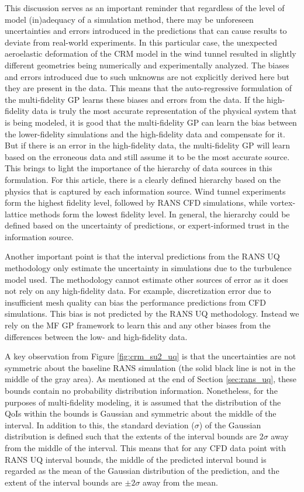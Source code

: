 This discussion serves as an important reminder that regardless of the level of model (in)adequacy of a simulation method, there may be unforeseen uncertainties and errors introduced in the predictions that can cause results to deviate from real-world experiments. In this particular case, the unexpected aeroelastic deformation of the CRM model in the wind tunnel resulted in slightly different geometries being numerically and experimentally analyzed. The biases and errors introduced due to such unknowns are not explicitly derived here but they are present in the data. This means that the auto-regressive formulation of the multi-fidelity GP learns these biases and errors from the data. If the high-fidelity data is truly the most accurate representation of the physical system that is being modeled, it is good that the multi-fidelity GP can learn the bias between the lower-fidelity simulations and the high-fidelity data and compensate for it. But if there is an error in the high-fidelity data, the multi-fidelity GP will learn based on the erroneous data and still assume it to be the most accurate source. This brings to light the importance of the hierarchy of data sources in this formulation. For this article, there is a clearly defined hierarchy based on the physics that is captured by each information source. Wind tunnel experiments form the highest fidelity level, followed by RANS CFD simulations, while vortex-lattice methods form the lowest fidelity level. In general, the hierarchy could be defined based on the uncertainty of predictions, or expert-informed trust in the information source.

Another important point is that the interval predictions from the RANS UQ methodology only estimate the uncertainty in simulations due to the turbulence model used. The methodology cannot estimate other sources of error as it does not rely on any high-fidelity data. For example, discretization error due to insufficient mesh quality can bias the performance predictions from CFD simulations. This bias is not predicted by the RANS UQ methodology. Instead we rely on the MF GP framework to learn this and any other biases from the differences between the low- and high-fidelity data. 

A key observation from Figure \ref{fig:crm_su2_uq} is that the uncertainties are not symmetric about the baseline RANS simulation (the solid black line is not in the middle of the gray area). As mentioned at the end of Section \ref{sec:rans_uq}, these bounds contain no probability distribution information. Nonetheless, for the purposes of multi-fidelity modeling, it is assumed that the distribution of the QoIs within the bounds is Gaussian and symmetric about the middle of the interval. In addition to this, the standard deviation ($\sigma$) of the Gaussian distribution is defined such that the extents of the interval bounds are $2\sigma$ away from the middle of the interval. This means that for any CFD data point with RANS UQ interval bounds, the middle of the predicted interval bound is regarded as the mean of the Gaussian distribution of the prediction, and the extent of the interval bounds are $\pm 2\sigma$ away from the mean.

